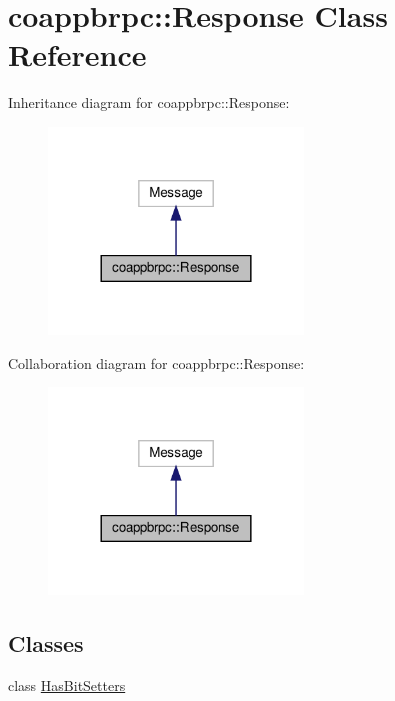 \hypertarget{classcoappbrpc_1_1Response}{}\section{coappbrpc\+:\+:Response Class Reference}
\label{classcoappbrpc_1_1Response}


Inheritance diagram for coappbrpc\+:\+:Response\+:\nopagebreak
\begin{figure}[H]
\begin{center}
\leavevmode
\includegraphics[width=192pt]{classcoappbrpc_1_1Response__inherit__graph}
\end{center}
\end{figure}


Collaboration diagram for coappbrpc\+:\+:Response\+:\nopagebreak
\begin{figure}[H]
\begin{center}
\leavevmode
\includegraphics[width=192pt]{classcoappbrpc_1_1Response__coll__graph}
\end{center}
\end{figure}
\subsection*{Classes}
\begin{DoxyCompactItemize}
\item 
class \hyperlink{classcoappbrpc_1_1Response_1_1HasBitSetters}{Has\+Bit\+Setters}
\end{DoxyCompactItemize}
